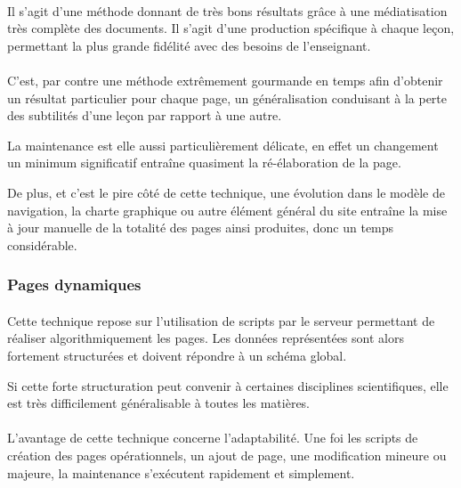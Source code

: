 \paragraph{}Il s'agit d'une méthode donnant de très bons résultats grâce à une médiatisation très complète des documents. Il s'agit d'une production spécifique à chaque leçon, permettant la plus grande fidélité avec des besoins de l'enseignant. 

\paragraph{}C'est, par contre une méthode extrêmement gourmande en temps afin d'obtenir un résultat particulier pour chaque page, un généralisation conduisant à la perte des subtilités d'une leçon par rapport à une autre. 

La maintenance est elle aussi particulièrement délicate, en effet un changement un minimum significatif entraîne quasiment la ré-élaboration de la page. 

De plus, et c'est le pire côté de cette technique, une évolution dans le modèle de navigation, la charte graphique ou autre élément général du site entraîne la mise à jour manuelle de la totalité des pages ainsi produites, donc un temps considérable.   

\subsubsection{Pages dynamiques}
\paragraph{}Cette technique repose sur l'utilisation de scripts par le serveur permettant de réaliser algorithmiquement les pages. Les données représentées sont alors fortement structurées et doivent répondre à un schéma global. 

Si cette forte structuration peut convenir à certaines disciplines scientifiques, elle est très difficilement généralisable à toutes les matières.

\paragraph{}L'avantage de cette technique concerne l'adaptabilité. Une foi les scripts de création des pages opérationnels, un ajout de page, une modification mineure ou majeure, la maintenance s'exécutent rapidement et simplement. 

